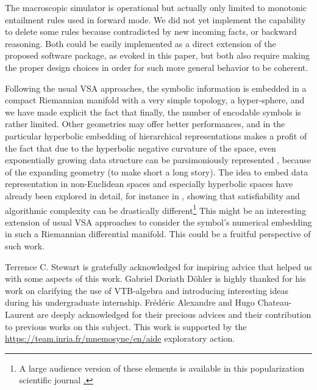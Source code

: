 \documentclass[sn-mathphys]{sn-jnl}
\begin{document}
The macroscopic simulator is operational but actually only limited to monotonic entailment rules used in forward mode. We did not yet implement the capability to delete some rules because contradicted by new incoming facts, or backward reasoning. Both could be easily implemented as a direct extension of the proposed software package, as evoked in this paper, but both also require making the proper design choices in order for such more general behavior to be coherent.

Following the usual VSA approaches, the symbolic information is embedded in a compact Riemannian manifold with a very simple topology, a hyper-sphere, and we have made explicit the fact that finally, the number of encodable symbols is rather limited. Other geometries may offer better performances, and in the particular hyperbolic embedding of hierarchical representations makes a profit of the fact that due to the hyperbolic negative curvature of the space, even exponentially growing data structure can be parsimoniously represented \cite{nickel_poincare_2017}, because of the expanding geometry (to make short a long story). The idea to embed data representation in non-Euclidean spaces and especially hyperbolic spaces have already been explored in detail, for instance in \cite{delahaye_complexites_2006}, showing that satisfiability and algorithmic complexity can be drastically different\footnote{A large audience version of these elements is available in this popularization scientific journal \href{https://interstices.info/calculer-dans-un-monde-hyperbolique}.} This might be an interesting extension of usual VSA approaches to consider the symbol's numerical embedding in such a Riemannian differential manifold. This could be a fruitful perspective of such work.


\backmatter


Terrence C. Stewart is gratefully acknowledged for inspiring advice that helped us with some aspects of this work. Gabriel Doriath Döhler is highly thanked for his work on clarifying the use of VTB-algebra and introducing interesting ideas during his undergraduate internship. Frédéric Alexandre and Hugo Chateau-Laurent are deeply acknowledged for their precious advices and their contribution to previous works on this subject. This work is supported by the \href{Inria, AEx AIDE}{https://team.inria.fr/mnemosyne/en/aide} exploratory action.
\end{document}
